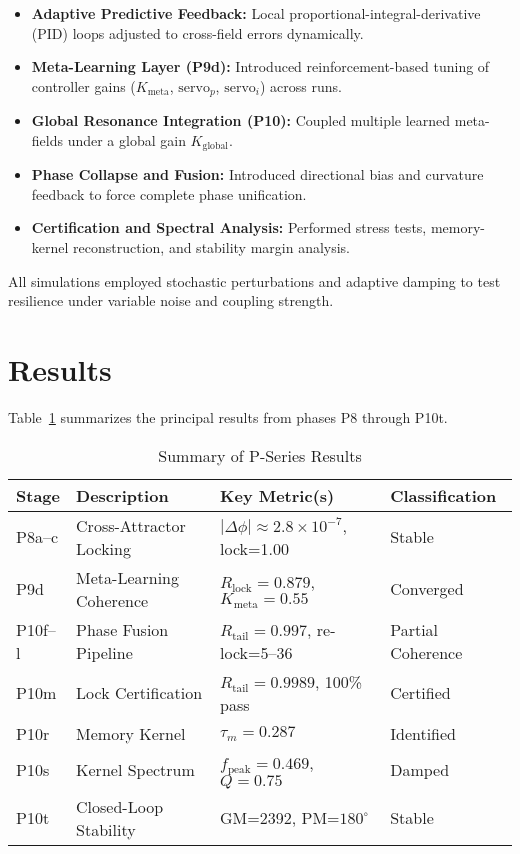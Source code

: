 \documentclass[conference]{IEEEtran}
\begin{document}
\begin{itemize}
  \item \textbf{Adaptive Predictive Feedback:} Local proportional-integral-derivative (PID) loops adjusted to cross-field errors dynamically.
  \item \textbf{Meta-Learning Layer (P9d):} Introduced reinforcement-based tuning of controller gains ($K_{\text{meta}}$, $\text{servo}_p$, $\text{servo}_i$) across runs.
  \item \textbf{Global Resonance Integration (P10):} Coupled multiple learned meta-fields under a global gain $K_{\text{global}}$.
  \item \textbf{Phase Collapse and Fusion:} Introduced directional bias and curvature feedback to force complete phase unification.
  \item \textbf{Certification and Spectral Analysis:} Performed stress tests, memory-kernel reconstruction, and stability margin analysis.
\end{itemize}

All simulations employed stochastic perturbations and adaptive damping to test resilience under variable noise and coupling strength.

\section{Results}
Table~\ref{tab:summary} summarizes the principal results from phases P8 through P10t.

\begin{table}[h]
\centering
\caption{Summary of P-Series Results}
\label{tab:summary}
\begin{tabular}{@{}llll@{}}
\toprule
Stage & Description & Key Metric(s) & Classification \\
\midrule
P8a--c & Cross-Attractor Locking & $|\Delta\phi|\approx2.8\times10^{-7}$, lock=1.00 & Stable \\
P9d & Meta-Learning Coherence & $R_{\text{lock}}=0.879$, $K_{\text{meta}}=0.55$ & Converged \\
P10f--l & Phase Fusion Pipeline & $R_{\text{tail}}=0.997$, re-lock=5--36 & Partial Coherence \\
P10m & Lock Certification & $R_{\text{tail}}=0.9989$, 100\% pass & Certified \\
P10r & Memory Kernel & $\tau_m=0.287$ & Identified \\
P10s & Kernel Spectrum & $f_{\text{peak}}=0.469$, $Q=0.75$ & Damped \\
P10t & Closed-Loop Stability & GM=2392, PM=$180^\circ$ & Stable \\
\bottomrule
\end{tabular}
\end{table}
\end{document}

